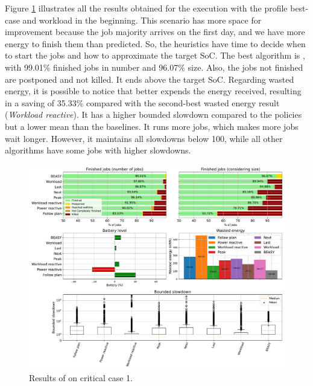 Figure \ref{fig:beasy_critical_1} illustrates all the results obtained for the execution with the profile best-case and workload in the beginning. This scenario has more space for improvement because the job majority arrives on the first day, and we have more energy to finish them than predicted. So, the heuristics have time to decide when to start the jobs and how to approximate the target SoC. The best algorithm is \emph{\systemName}, with 99.01\% finished jobs in number and 96.07\% size. Also, the jobs not finished are postponed and not killed. It ends above the target SoC. Regarding wasted energy, it is possible to notice that \emph{\systemName} better expends the energy received, resulting in a saving of 35.33\% compared with the second-best wasted energy result (\emph{Workload reactive}). It has a higher bounded slowdown compared to the policies but a lower mean than the baselines. It runs more jobs, which makes more jobs wait longer. However, it maintains all slowdowns below 100, while all other algorithms have some jobs with higher slowdowns.

\begin{figure}[!htb]
    \centering
    \includegraphics[scale=0.39]{Images/Heuristic/profile_best_workload_1_with_noise.pdf}
    \caption{Results of \emph{\systemName} on critical case 1.}
    \label{fig:beasy_critical_1}
\end{figure}

